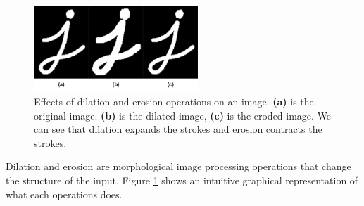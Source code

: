 \begin{figure}
    \centering
    \includegraphics[width=0.55\textwidth]{images/appendix/ero_vs_dil.png}
    \caption[Effects of dilation and erosion operations on an image.]{Effects of dilation and erosion operations on an image. \textbf{(a)} is the original image. \textbf{(b)} is the dilated image, \textbf{(c)} is the eroded image. We can see that dilation expands the strokes and erosion contracts the strokes.\cite{OpenCVErodingDilating}}
    \label{fig:ero_vs_dil}
\end{figure}
Dilation and erosion are morphological image processing operations that change the structure of the input. Figure \ref{fig:ero_vs_dil} shows an intuitive graphical representation of what each operations does.




